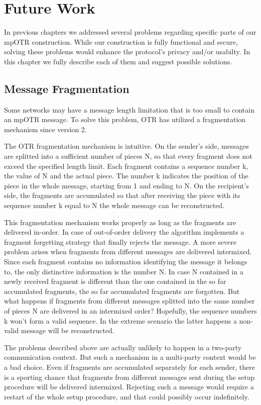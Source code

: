 \chapter{Future Work}
\label{chapters:FutureWork}
In previous chapters we addressed several problems regarding specific parts of our mpOTR construction. While our construction is fully functional and secure, solving these problems would enhance the protocol's privacy and/or usabilty. In this chapter we fully describe each of them and suggest possible solutions.

\section{Message Fragmentation}
\label{sections:fragmentation}
Some networks may have a message length limitation that is too small to contain an mpOTR message. To solve this problem, OTR has utilized a fragmentation mechanism since version 2.

The OTR fragmentation mechanism is intuitive. On the sender's side, messages are splitted into a sufficient number of pieces N, so that every fragment does not exceed the specified length limit. Each fragment contains a sequence number k, the value of N and the actual piece. The number k indicates the position of the piece in the whole message, starting from 1 and ending to N. On the recipient's side, the fragments are accumulated so that after receiving the piece with its sequence number k equal to N the whole message can be reconstructed.

This fragmentation mechanism works properly as long as the fragments are delivered in-order. In case of out-of-order delivery the algorithm implements a fragment forgetting strategy that finally rejects the message. A more severe problem arises when fragments from different messages are delivered intermixed. Since each fragment contains no information identifying the message it belongs to, the only distinctive information is the number N. In case N contained in a newly received fragment is different than the one contained in the so far accumulated fragments, the so far accumulated fragments are forgotten. But what happens if fragments from different messages splitted into the same number of pieces N are delivered in an intermixed order? Hopefully, the sequence numbers k won't form a valid sequence. In the extreme scenario the latter happens a non-valid message will be reconstructed.

The problems described above are actually unlikely to happen in a two-party communication context. But such a mechanism in a multi-party context would be a bad choice. Even if fragments are accumulated separately for each sender, there is a sporting chance that fragments from different messages sent during the setup procedure will be delivered intermixed. Rejecting such a message would require a restart of the whole setup procedure, and that could possibly occur indefinitely.

